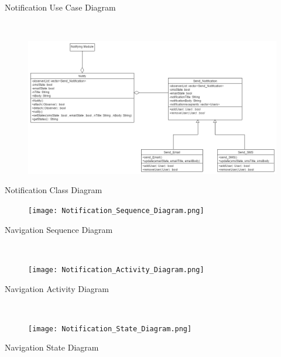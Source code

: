 \documentclass{article}
\begin{document}
    Notification Use Case Diagram
    
    \mbox{}\\
    \bigskip
    \clearpage
    
    \begin{figure}[h!]
        \includegraphics[width=\textwidth]{Notifications_Class_Diagram.png}
    \end{figure}
    Notification Class Diagram
    
    \begin{figure}[h!]
        \texttt{[image: Notification\_Sequence\_Diagram.png]}
    \end{figure}
    Navigation Sequence Diagram
    
    \mbox{}\\
    \bigskip
    \clearpage
    
    \begin{figure}[h!]
        \begin{center}
            \texttt{[image: Notification\_Activity\_Diagram.png]}
        \end{center}
    \end{figure}
    
    Navigation Activity Diagram
    
    \mbox{}\\
    \bigskip
    \clearpage
    
    \begin{figure}[h!]
        \begin{center}
            \texttt{[image: Notification\_State\_Diagram.png]}
        \end{center}
    \end{figure}
    
    Navigation State Diagram
    
    \mbox{}\\
\end{document}
